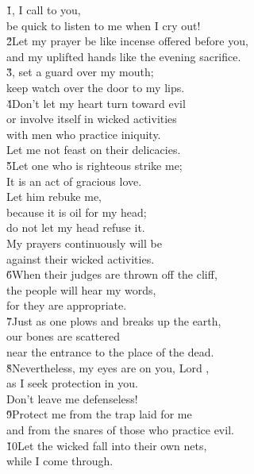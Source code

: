 \begin{poetry}
\poeml \v{1}, I call to you, \\
\poemll    be quick to listen to me when I cry out! \\
\poeml \v{2}Let my prayer be like incense offered before you, \\
\poemll    and my uplifted hands like the evening sacrifice. \\
\poeml \v{3}, set a guard over my mouth; \\
\poemll    keep watch over the door to my lips. \\
\poeml \v{4}Don't let my heart turn toward evil \\
\poemll    or involve itself in wicked activities \\
\poeml with men who practice iniquity. \\
\poemll    Let me not feast on their delicacies. \\
\poeml \v{5}Let one who is righteous strike me; \\
\poemll    It is an act of gracious love. \\
\poeml Let him rebuke me, \\
\poemll    because it is oil for my head; \\
\poemll    do not let my head refuse it. \\
\poeml My prayers continuously will be \\
\poemll    against their wicked activities. \\
\poeml \v{6}When their judges are thrown off the cliff, \\
\poemll    the people will hear my words, \\
\poemlll       for they are appropriate. \\
\poeml \v{7}Just as one plows and breaks up the earth, \\
\poemll    our bones are scattered \\
\poemlll       near the entrance to the place of the dead. \\
\poeml \v{8}Nevertheless, my eyes are on you, Lord , \\
\poemll    as I seek protection in you. \\
\poemlll       Don't leave me defenseless! \\
\poeml \v{9}Protect me from the trap laid for me \\
\poemll    and from the snares of those who practice evil. \\
\poeml \v{10}Let the wicked fall into their own nets, \\
\poemll    while I come through.
\end{poetry}

